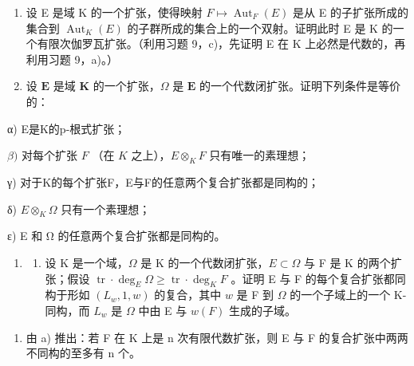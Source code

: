 \begin{enumerate}
\def\labelenumi{\arabic{enumi})}
\setcounter{enumi}{9}
\item
  设 E 是域 K 的一个扩张，使得映射 \(F \mapsto \operatorname{Aut}_{F}(E)\) 是从 E 的子扩张所成的集合到 \(\operatorname{Aut}_{K}(E)\) 的子群所成的集合上的一个双射。证明此时 E 是 K 的一个有限次伽罗瓦扩张。（利用习题 9，c)，先证明 E 在 K 上必然是代数的，再利用习题 9，a)。）
\item
  设 \(\mathbf{E}\) 是域 \(\mathbf{K}\) 的一个扩张，\(\Omega\) 是 \(\mathbf{E}\) 的一个代数闭扩张。证明下列条件是等价的：
\end{enumerate}

α) E是K的p-根式扩张；

\(\beta)\) 对每个扩张 \(F\) （在 \(K\) 之上），\(E \otimes_{K} F\) 只有唯一的素理想；

γ) 对于K的每个扩张F，E与F的任意两个复合扩张都是同构的；

δ) \(E \otimes_{K} \Omega\) 只有一个素理想；

ε) E 和 Ω 的任意两个复合扩张都是同构的。

\begin{enumerate}
\def\labelenumi{\arabic{enumi})}
\setcounter{enumi}{11}
\tightlist
\item
  \begin{enumerate}
  \def\labelenumii{\alph{enumii})}
  \tightlist
  \item
    设 K 是一个域，\(\Omega\) 是 K 的一个代数闭扩张，\(E \subset \Omega\) 与 F 是 K 的两个扩张；假设 \(\operatorname{tr} \cdot \deg_E \Omega \geqslant \operatorname{tr} \cdot \deg_K F\) 。证明 E 与 F 的每个复合扩张都同构于形如 \((L_w, 1, w)\) 的复合，其中 \(w\) 是 F 到 \(\Omega\) 的一个子域上的一个 K-同构，而 \(L_w\) 是 \(\Omega\) 中由 E 与 \(w(F)\) 生成的子域。
  \end{enumerate}
\end{enumerate}

\begin{enumerate}
\def\labelenumi{\alph{enumi})}
\setcounter{enumi}{1}
\tightlist
\item
  由 a) 推出：若 F 在 K 上是 n 次有限代数扩张，则 E 与 F 的复合扩张中两两不同构的至多有 n 个。
\end{enumerate}


